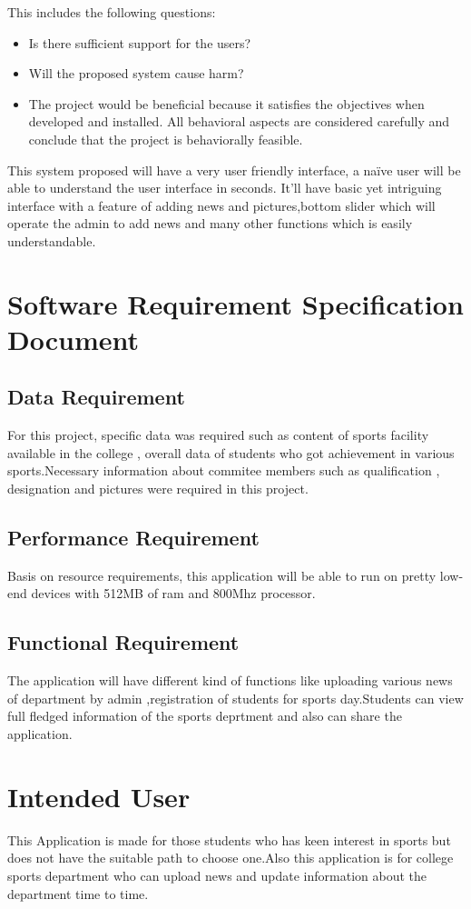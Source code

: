 This includes the following questions:
\begin{itemize}
	\item Is there sufficient support for the users?
	\item Will the proposed system cause harm?
	\item The project would be beneficial because it satisfies the objectives when developed and installed. All behavioral aspects are considered carefully and conclude that the project is behaviorally feasible.
\end{itemize}

This system proposed will have a very user friendly interface, a naïve user will be able to understand the user interface in seconds. It’ll have basic yet intriguing interface with a feature of adding news and pictures,bottom slider which will operate the admin to add news and many other functions which is easily understandable.

\section{Software Requirement Specification Document}
\subsection{Data Requirement}
For this project, specific data was required such as content of sports facility available in the college , overall data of students who got achievement in various sports.Necessary information about commitee members such as qualification  , designation and pictures were required in this project.    

\subsection{Performance Requirement}
Basis on resource requirements, this application will be able to run on pretty low-end devices with 512MB of ram and 800Mhz processor.

\subsection{Functional Requirement}
The application will have different kind of functions like uploading various news of department by admin ,registration of students for sports day.Students can view full fledged information of the sports deprtment and also can share the application.  

\section{Intended User}
This Application is made for those students who has keen interest in sports but does not have the suitable path to choose one.Also this application is for college sports department who can upload news and update information about the department time to time.  

